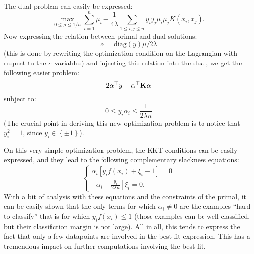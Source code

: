 \documentclass[a4paper, 11pt]{article}
\newcommand{\K}{\bold{K}}
\newcommand{\pmset}{\left\{\pm1\right\}}
\begin{document}
The dual problem can easily be expressed:
\begin{equation}
  \max\limits_{0\leq\mu\leq 1/n}
  \sum\limits_{i=1}^n\mu_i
  - \frac{1}{4\lambda}\sum\limits_{1\leq i,j \leq n}y_iy_j\mu_i\mu_jK(x_i, x_j).
\end{equation}
Now expressing the relation between primal and dual solutions:
\begin{equation}
  \alpha = \text{diag}(y)\mu/2\lambda
\end{equation}
(this is done by rewriting the optimization condition on the
Lagrangian with respect to the $\alpha$ variables)
and injecting this relation into the dual, we get the following
easier problem:
\begin{equation}
  2\alpha^\top y - \alpha^\top \K \alpha
\end{equation}
subject to:
\begin{equation}
  0 \leq y_i\alpha_i \leq \frac{1}{2\lambda n}
\end{equation}
(The crucial point in deriving this new optimization problem is
to notice that $y_i^2 = 1$, since $y_i \in \pmset$).

On this very simple optimization problem, the KKT conditions can
be easily expressed, and they lead to the following complementary
slackness equations:
\begin{equation}
  \begin{cases}
    \alpha_i\left[y_if(x_i) + \xi_i - 1\right] = 0\\
    \left[\alpha_i - \frac{y_i}{2\lambda n}\right]\xi_i = 0.
  \end{cases}
\end{equation}
With a bit of analysis with these equations and the constraints
of the primal, it can be easily shown that the only terms for
which $\alpha_i \neq 0$ are the examples ``hard to classify'' that
is for which $y_i f(x_i) \leq 1$ (those examples can be well
classified, but their classifiction margin is not large). All in
all, this tends to express the fact that only a few datapoints
are involved in the best fit expression. This has a tremendous
impact on further computations involving the best fit.
\end{document}
